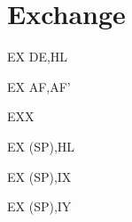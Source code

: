 \documentclass[12pt,twoside,openright,a4paper]{book}
\begin{document}
\section{Exchange}

\begin{instrtable}	

	\begin{instruction}{EX DE,HL} 
			\Flags{\FN}{\FN}{\FN}{\FN}{\FN}{\FN}
	\end{instruction}

	\begin{instruction}{EX AF,AF'} 
			\Flags{\FN}{\FN}{\FN}{\FN}{\FN}{\FN}
	\end{instruction}

	\begin{instruction}{EXX} 
			\Flags{\FN}{\FN}{\FN}{\FN}{\FN}{\FN}
		\SkipToSymbol
		\SkipToSymbol
	\end{instruction}

	\begin{instruction}{EX (SP),HL} 
			\Flags{\FN}{\FN}{\FN}{\FN}{\FN}{\FN}
		\SkipToSymbol 
	\end{instruction}

	\begin{instruction}{EX (SP),IX} 
			\Flags{\FN}{\FN}{\FN}{\FN}{\FN}{\FN}
		\SkipToSymbol
			\FromSymbolToOpCode
	\end{instruction}

	\begin{lastinstruction}{EX (SP),IY} 
			\Flags{\FN}{\FN}{\FN}{\FN}{\FN}{\FN}
		\SkipToSymbol
			\FromSymbolToOpCode
	\end{lastinstruction}

\end{instrtable}
\end{document}

